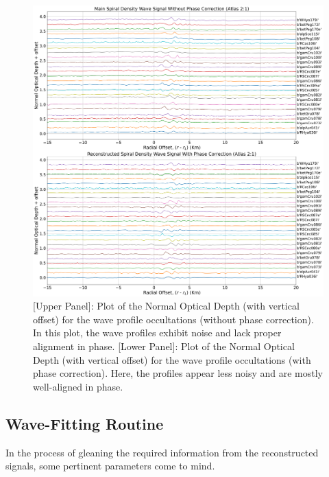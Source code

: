 \documentclass{article}
\begin{document}


\begin{figure}[h]
    \centering
    \includegraphics[width=0.5\linewidth]{main_reconstructed_atlas21.png}
    \caption{[Upper Panel]: Plot of the Normal Optical Depth (with vertical offset) for the wave profile occultations (without phase correction). In this plot, the wave profiles exhibit noise and lack proper alignment in phase. [Lower Panel]: Plot of the Normal Optical Depth (with vertical offset) for the wave profile occultations (with phase correction). Here, the profiles appear less noisy and are mostly well-aligned in phase.}
    \label{fig:enter-label}
\end{figure}


\subsection{Wave-Fitting Routine}
In the process of gleaning the required information from the reconstructed signals, some pertinent parameters come to mind. 
\end{document}
